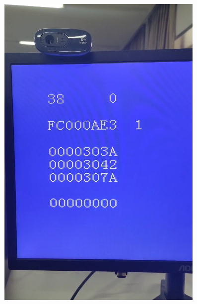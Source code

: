 \documentclass[12pt,hyperref,a4paper,UTF8]{ctexart}
\begin{document}
\begin{figure}[H]
\begin{minipage}[b]{0.24\textwidth}
        \includegraphics[width=\textwidth]{figures/fig/fram3.png}
    \end{minipage}
    \begin{minipage}[b]{0.24\textwidth}
        \centering

\end{minipage}
\end{figure}
\end{document}
